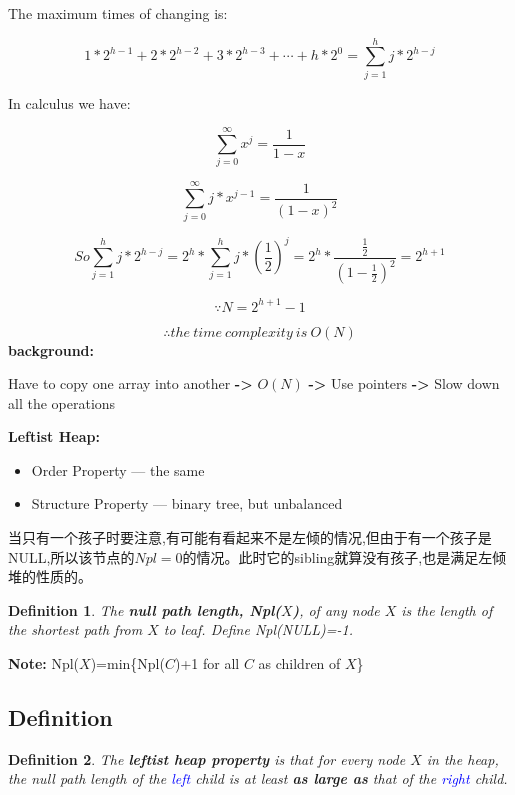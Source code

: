 \documentclass{article}
\newtheorem*{Definition}{Definition}
\begin{document}
The maximum times of changing is:

$$1*2^{h-1} + 2 * 2^{h-2} + 3*2^{h-3} + \cdots + h*2^0 = \sum\limits_{j=1}^{h}j*2^{h-j}$$

In calculus we have:

$$\sum\limits_{j=0}^{\infty}x^j = \frac{1}{1-x}$$

$$\sum\limits_{j=0}^{\infty}j*x^{j-1} = \frac{1}{(1-x)^2}$$

$$So \sum\limits_{j=1}^{h}j*2^{h-j} = 2^h * \sum_{j=1}^{h} j*(\frac{1}{2})^j = 2^h * \frac{\frac{1}{2}}{(1-\frac{1}{2})^2} = 2^{h+1}$$

$$\because N = 2^{h+1} - 1$$

$$\therefore the \ time \ complexity \ is \ O(N)$$
\noindent \textbf{background:}\par
Have to copy one array into another \textbf{-\textgreater} $O(N)$ \textbf{-\textgreater} Use pointers \textbf{-\textgreater} Slow down all the operations\par

\noindent \textbf{Leftist Heap:}
\begin{itemize}
    \item Order Property --- the same
    \item Structure Property --- binary tree, but unbalanced
\end{itemize}

\par
当只有一个孩子时要注意,有可能有看起来不是左倾的情况,但由于有一个孩子是NULL,所以该节点的$Npl = 0$的情况。此时它的sibling就算没有孩子,也是满足左倾堆的性质的。
\par

\begin{Definition}
    The \textbf{null path length, Npl($X$)}, of any node $X$ is the length of the shortest path from $X$ to leaf. Define Npl(NULL)=-1. 
\end{Definition}

\textbf{Note:} Npl($X$)=min\{Npl($C$)+1 for all $C$ as children of $X$\}

\subsection{Definition}
\begin{Definition}
    The \textbf{leftist heap property} is that for every node $X$ in the heap, the null path length of the \textcolor{blue}{left} child is at least \textbf{as large as} that of the \textcolor{blue}{right} child. 
\end{Definition}
\end{document}
